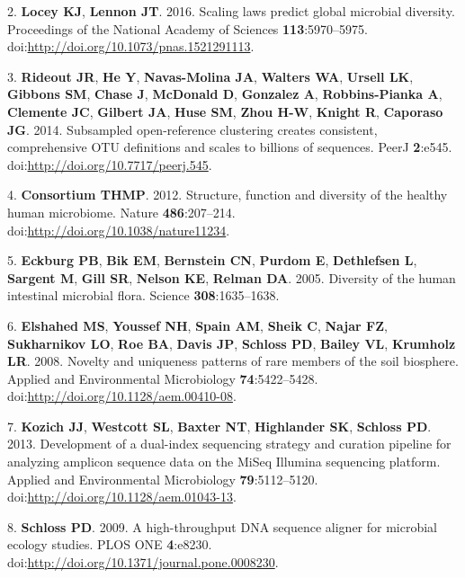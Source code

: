 \documentclass[11pt,]{article}
\begin{document}
2. \textbf{Locey KJ}, \textbf{Lennon JT}. 2016. Scaling laws predict
global microbial diversity. Proceedings of the National Academy of
Sciences \textbf{113}:5970--5975.
doi:\url{http://doi.org/10.1073/pnas.1521291113}.

3. \textbf{Rideout JR}, \textbf{He Y}, \textbf{Navas-Molina JA},
\textbf{Walters WA}, \textbf{Ursell LK}, \textbf{Gibbons SM},
\textbf{Chase J}, \textbf{McDonald D}, \textbf{Gonzalez A},
\textbf{Robbins-Pianka A}, \textbf{Clemente JC}, \textbf{Gilbert JA},
\textbf{Huse SM}, \textbf{Zhou H-W}, \textbf{Knight R}, \textbf{Caporaso
JG}. 2014. Subsampled open-reference clustering creates consistent,
comprehensive OTU definitions and scales to billions of sequences. PeerJ
\textbf{2}:e545. doi:\url{http://doi.org/10.7717/peerj.545}.

4. \textbf{Consortium THMP}. 2012. Structure, function and diversity of
the healthy human microbiome. Nature \textbf{486}:207--214.
doi:\url{http://doi.org/10.1038/nature11234}.

5. \textbf{Eckburg PB}, \textbf{Bik EM}, \textbf{Bernstein CN},
\textbf{Purdom E}, \textbf{Dethlefsen L}, \textbf{Sargent M},
\textbf{Gill SR}, \textbf{Nelson KE}, \textbf{Relman DA}. 2005.
Diversity of the human intestinal microbial flora. Science
\textbf{308}:1635--1638.

6. \textbf{Elshahed MS}, \textbf{Youssef NH}, \textbf{Spain AM},
\textbf{Sheik C}, \textbf{Najar FZ}, \textbf{Sukharnikov LO},
\textbf{Roe BA}, \textbf{Davis JP}, \textbf{Schloss PD}, \textbf{Bailey
VL}, \textbf{Krumholz LR}. 2008. Novelty and uniqueness patterns of rare
members of the soil biosphere. Applied and Environmental Microbiology
\textbf{74}:5422--5428. doi:\url{http://doi.org/10.1128/aem.00410-08}.

7. \textbf{Kozich JJ}, \textbf{Westcott SL}, \textbf{Baxter NT},
\textbf{Highlander SK}, \textbf{Schloss PD}. 2013. Development of a
dual-index sequencing strategy and curation pipeline for analyzing
amplicon sequence data on the MiSeq Illumina sequencing platform.
Applied and Environmental Microbiology \textbf{79}:5112--5120.
doi:\url{http://doi.org/10.1128/aem.01043-13}.

8. \textbf{Schloss PD}. 2009. A high-throughput DNA sequence aligner for
microbial ecology studies. PLOS ONE \textbf{4}:e8230.
doi:\url{http://doi.org/10.1371/journal.pone.0008230}.
\end{document}
